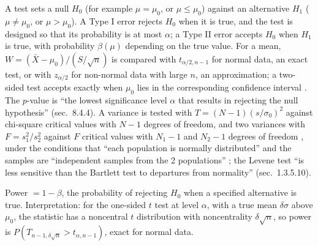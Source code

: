 \begin{qfmethod}\label{meth:hypothesis-testing}
 A test sets a null $H_0$ (for example $\mu=\mu_0$, or $\mu\le\mu_0$) against an alternative $H_1$ ($\mu\neq\mu_0$, or $\mu>\mu_0$). A Type I error rejects $H_0$ when it is true, and the test is designed so that its probability is at most $\alpha$; a Type II error accepts $H_0$ when $H_1$ is true, with probability $\beta(\mu)$ depending on the true value. For a mean, $W=(\bar X-\mu_0)/(S/\sqrt n)$ is compared with $t_{\alpha/2,n-1}$ for normal data, an exact test, or with $z_{\alpha/2}$ for non-normal data with large $n$, an approximation; a two-sided test accepts exactly when $\mu_0$ lies in the corresponding confidence interval \citep[sec.~8.4.3]{probability-statistics-random-processes}. The $p$-value is ``the lowest significance level $\alpha$ that results in rejecting the null hypothesis'' (sec.~8.4.4). A variance is tested with $T=(N-1)(s/\sigma_0)^2$ against chi-square critical values with $N-1$ degrees of freedom, and two variances with $F=s_1^2/s_2^2$ against $F$ critical values with $N_1-1$ and $N_2-1$ degrees of freedom \citep[secs.~1.3.5.8--1.3.5.9]{statistical-methods-handbook}, under the conditions that ``each population is normally distributed'' and the samples are ``independent samples from the 2 populations'' \citep[Lesson~12, sec.~12.1, ``Test to Compare Two Population Variances'']{applied-statistics-course-notes}; the Levene test ``is less sensitive than the Bartlett test to departures from normality'' (sec.~1.3.5.10).

 Power $=1-\beta$, the probability of rejecting $H_0$ when a specified alternative is true. Interpretation: for the one-sided $t$ test at level $\alpha$, with a true mean $\delta\sigma$ above $\mu_0$, the statistic has a noncentral $t$ distribution with noncentrality $\delta\sqrt n$, so power is $P(T_{n-1,\delta\sqrt n}>t_{\alpha,n-1})$, exact for normal data.


\end{qfmethod}
